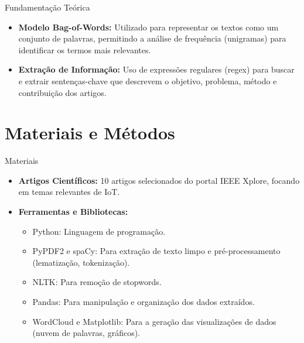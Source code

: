 \documentclass{beamer}
\begin{document}
\begin{frame}{Fundamentação Teórica}
\begin{itemize}
    \item \textbf{Modelo Bag-of-Words:} Utilizado para representar os textos como um conjunto de palavras, permitindo a análise de frequência (unigramas) para identificar os termos mais relevantes.
    \item \textbf{Extração de Informação:} Uso de expressões regulares (regex) para buscar e extrair sentenças-chave que descrevem o objetivo, problema, método e contribuição dos artigos.
\end{itemize}
\end{frame}

\section{Materiais e Métodos}
\begin{frame}{Materiais}
    \begin{itemize}
        \item \textbf{Artigos Científicos:} 10 artigos selecionados do portal IEEE Xplore, focando em temas relevantes de IoT.
        \item \textbf{Ferramentas e Bibliotecas:}
        \begin{itemize}
            \item Python: Linguagem de programação.
            \item PyPDF2 e spaCy: Para extração de texto limpo e pré-processamento (lematização, tokenização).
            \item NLTK: Para remoção de stopwords.
            \item Pandas: Para manipulação e organização dos dados extraídos.
            \item WordCloud e Matplotlib: Para a geração das visualizações de dados (nuvem de palavras, gráficos).
        \end{itemize}
    \end{itemize}
\end{frame}
\end{document}

